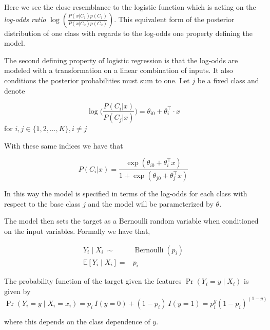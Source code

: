 Here we see the close resemblance to the logistic function which is acting on the \textit{log-odds ratio} $ \log(  \frac{ P(x|C_1)p(C_1)}{P(x|C_2)p(C_2) })$. This equivalent form of the posterior distribution of one class with regards to the log-odds one property defining the model.



The second defining property of logistic regression is that the log-odds are modeled with a transformation on a linear combination of inputs. It also conditions the posterior probabilities must sum to one. Let $j$ be a fixed class and denote

\begin{equation}\label{logit-logOddss}
 \log\big( \frac{P(C_i|x)}{P(C_j|x)}\big) = \theta_{i0} + \theta_i^\intercal \cdot x
 \end{equation}  for $i,j \in \{1,2,\ldots,K\}, i\neq j$

With these same indices we have that

\begin{equation} P(C_i|x) = \frac{\exp(\theta_{i0} + \theta_i^\intercal x)}{1 + \exp(\theta_{j0} + \theta_j^\intercal x)}
\end{equation}

In this way the model is specified in terms of the log-odds for each class with respect to the base class $j$ and the model will be parameterized by $\theta$.

The model then sets the target as a Bernoulli random variable when conditioned on the input variables. Formally we have that,

\begin{equation}
\begin{split}
Y_i \mid X_i \ \sim & \operatorname{Bernoulli}(p_i) \\
\mathbb{E}[Y_i \mid X_i ] = & p_i
\end{split}
\end{equation}


The probability function of the target given the features $\Pr(Y_i=y\mid X_i)$ is given by
\begin{equation}\label{logit-probabilityDensity}
\Pr(Y_i=y \mid X_i = x_i) = p_i \ I(y=0) + (1-p_i) \ I(y=1) = p_i^{y} {(1-p_i)}^{(1-y)}
\end{equation}

where this depends on the class dependence of $y$.

